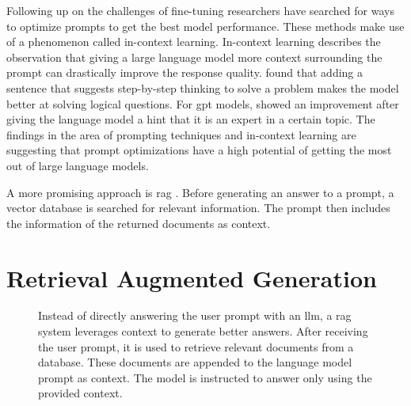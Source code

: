 \documentclass[../main.tex]{subfiles}
\begin{document}
Following up on the challenges of fine-tuning researchers have searched for ways to optimize prompts to get the best model performance.
These methods make use of a phenomenon called in-context learning.
In-context learning describes the observation that giving a large language model more context surrounding the prompt can drastically improve the response quality.
\cite{Wei2022} found that adding a sentence that suggests step-by-step thinking to solve a problem makes the model better at solving logical questions.
For \gls{gpt} models, \autocite{Xu2023} showed an improvement after giving the language model a hint that it is an expert in a certain topic.
The findings in the area of prompting techniques and in-context learning are suggesting
that prompt optimizations have a high potential of getting the most out of large language models.

A more promising approach is \gls{rag} \cite{Lewis2020}.
Before generating an answer to a prompt, a vector database is searched for relevant information.
The prompt then includes the information of the returned documents as context.

\section{Retrieval Augmented Generation}
\label{sec:rag}

\begin{figure}[t]
    \centering
    \caption{Instead of directly answering the user prompt with an \gls{llm},
        a \gls{rag} system leverages context to generate better answers.
        After receiving the user prompt, it is used to retrieve relevant documents from a database.
        These documents are appended to the language model prompt as context.
        The model is instructed to answer only using the provided context.}
    \label{fig:rag_flowchart}
\end{figure}
\end{document}
